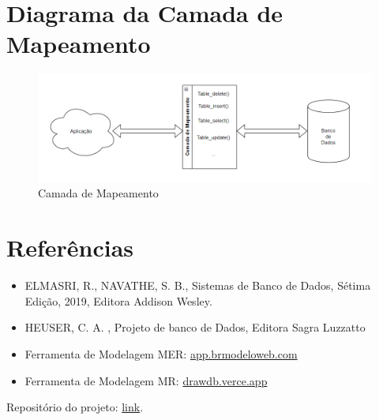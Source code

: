 \documentclass{article}
\begin{document}
\section{Diagrama da Camada de Mapeamento}
\begin{figure}[!ht]
        \centering
        \includegraphics[width=1\textwidth]{imagens/mapeamento.png}
        \caption{Camada de Mapeamento}
\end{figure}

\section{Referências}
\begin{itemize}
        \item ELMASRI, R., NAVATHE, S. B., Sistemas de Banco de Dados, Sétima Edição, 2019, Editora Addison Wesley.
        \item HEUSER, C. A. , Projeto de banco de Dados, Editora Sagra Luzzatto
        \item Ferramenta de Modelagem MER: \href{https://app.brmodeloweb.com/#!/conceptual/66dd8939bb821248818df271}{app.brmodeloweb.com}
        \item Ferramenta de Modelagem MR: \href{https://drawdb.vercel.app/}{drawdb.verce.app}
\end{itemize}

Repositório do projeto: \href{https://github.com/qrno/BD-2024-1}{link}.
\end{document}
